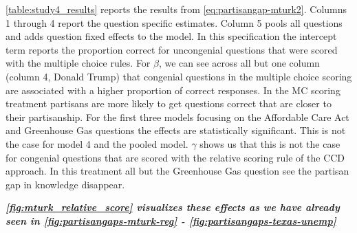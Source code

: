 \documentclass[12pt, letterpaper]{article}
\newcommand{\bgcd} {\color{purple}\em }
\newcommand{\ech}{\color{black}\rm  }    %
\begin{document}
	\cref{table:study4_results} reports the results from \cref{eq:partisangap-mturk2}. Columns 1 through 4 report the question specific estimates. Column 5 pools all questions and adds question fixed effects to the model. In this specification the intercept term reports the proportion correct for uncongenial questions that were scored with the multiple choice rules. For \(\beta\), we can see across all but one column (column 4, Donald Trump) that congenial questions in the multiple choice scoring are associated with a higher proportion of correct responses. In the MC scoring treatment partisans are more likely to get questions correct that are closer to their partisanship. For the first three models focusing on the Affordable Care Act and Greenhouse Gas questions the effects are statistically significant. This is not the case for model 4 and the pooled model. \(\gamma\) shows us that this is not the case for congenial questions that are scored with the relative scoring rule of the CCD approach. In this treatment all but the Greenhouse Gas question see the partisan gap in knowledge disappear.
	
	
	\bgcd  \textbf{\cref{fig:mturk_relative_score} visualizes these effects as we have already seen in \cref{fig:partisangaps-mturk-reg} - \cref{fig:partisangaps-texas-unemp}} \ech
	
\end{document}
